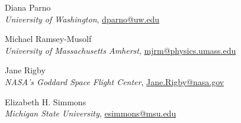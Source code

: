 \noindent Diana Parno\\
\indent \emph{University of Washington}, \href{mailto:dparno@uw.edu}{dparno@uw.edu}\vspace*{\baselineskip}

\noindent Michael Ramsey-Musolf\\
\indent \emph{University of Massachusetts Amherst}, \href{mailto:mjrm@physics.umass.edu}{mjrm@physics.umass.edu}\vspace*{\baselineskip}

\noindent Jane Rigby\\
\indent \emph{NASA's Goddard Space Flight Center}, \href{mailto:Jane.Rigby@nasa.gov}{Jane.Rigby@nasa.gov}\vspace*{\baselineskip}

\noindent Elizabeth H. Simmons\\
\indent \emph{Michigan State University}, \href{mailto:esimmons@msu.edu}{esimmons@msu.edu}